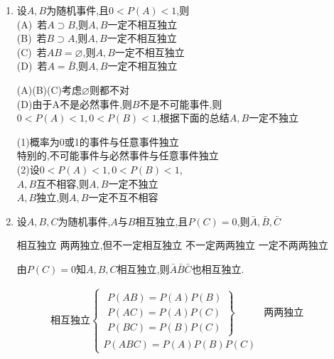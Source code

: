 \documentclass[12pt, a4paper, oneside, UTF8]{ctexbook}
\begin{document}
\begin{enumerate}[label=\arabic*.,start=12]
    \item  设$A,B$为随机事件,且$0<P(A)<1$,则 \\
        (A)\ 若$A\supset B$,则$A,B$一定不相互独立 \\
        (B)\ 若$B\supset A$,则$A,B$一定不相互独立 \\
        (C)\ 若$AB=\varnothing$,则$A,B$一定不相互独立 \\
        (D)\ 若$A=\bar{B}$,则$A,B$一定不相互独立
    
    \begin{solution}
    (A)(B)(C)考虑$\varnothing$则都不对\\
    (D)由于A不是必然事件,则$B$不是不可能事件,则$0<P(A)<1,0<P(B)<1$,根据下面的总结$A,B$一定不独立
    \end{solution}
    \begin{tcolorbox}[title=总结]
        (1)概率为0或1的事件与任意事件独立 \\
        特别的,不可能事件与必然事件与任意事件独立 \\
        (2)设$0<P(A)<1, 0<P(B)<1$, \\
        $A,B$互不相容,则$A,B$一定不独立 \\
        $A,B$独立,则$A,B$一定不互不相容
    \end{tcolorbox}
    \item  设$A,B,C$为随机事件,$A$与$B$相互独立,且$P(C)=0$,则$\bar{A},\bar{B},\bar{C}$
    \begin{choices}[2]
    \task 相互独立 
    \task 两两独立,但不一定相互独立
    \task 不一定两两独立 
    \task 一定不两两独立
    \end{choices}
    \begin{solution}
    由$P(C)=0$知$A,B,C$相互独立,则$\bar{A}\bar{B}\bar{C}$也相互独立.
    \end{solution}

\end{enumerate}
\begin{tcolorbox}[title=两两独立与相互独立]
    \begin{align*}
        \text{相互独立}\left\{\begin{matrix}
        \left.\begin{matrix}
        P(AB)=P(A)P(B) \\
        P(AC)=P(A)P(C) \\
        P(BC)=P(B)P(C)
        \end{matrix}\right\}& \text{两两独立} \\
        P(ABC)=P(A)P(B)P(C)
        \end{matrix}\right.
    \end{align*}
\end{tcolorbox}

\ifx\allfiles\undefined
\end{document}
